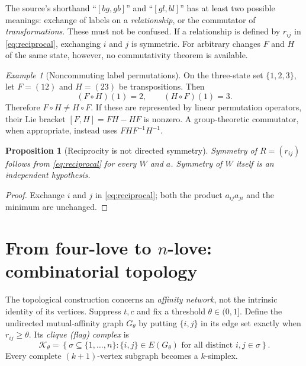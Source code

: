\documentclass[11pt,a4paper]{article}
\numberwithin{equation}{section}
\newtheorem{proposition}[definition]{Proposition}
\theoremstyle{remark}
\newtheorem{example}[definition]{Example}
\newcommand{\K}{\mathcal{K}}
\newcommand{\1}{\mathbf{1}}
\begin{document}
The source's shorthand ``$[bg,gb]$'' and ``$[gl,bl]$'' has at least two
possible meanings: exchange of labels on a \emph{relationship}, or the
commutator of \emph{transformations}.  These must not be confused.
If a relationship is defined by $r_{ij}$ in
\eqref{eq:reciprocal}, exchanging $i$ and $j$ is symmetric.
For arbitrary changes $F$ and $H$ of the same state, however, no
commutativity theorem is available.

\begin{example}[Noncommuting label permutations]
On the three-state set $\{1,2,3\}$, let $F=(12)$ and $H=(23)$
be transpositions.  Then
\begin{equation}
(F\circ H)(1)=2,\qquad (H\circ F)(1)=3.
\end{equation}
Therefore $F\circ H\ne H\circ F$.  If these are represented by linear
permutation operators, their Lie bracket $[F,H]=FH-HF$ is nonzero.
A group-theoretic commutator, when appropriate, instead uses
$FHF^{-1}H^{-1}$.
\end{example}

\begin{proposition}[Reciprocity is not directed symmetry]
Symmetry of $R=(r_{ij})$ follows from \eqref{eq:reciprocal} for every
$W$ and $a$.  Symmetry of $W$ itself is an independent hypothesis.
\end{proposition}
\begin{proof}
Exchange $i$ and $j$ in \eqref{eq:reciprocal}; both the product
$a_{ij}a_{ji}$ and the minimum are unchanged.
\end{proof}

\section{From four-love to \texorpdfstring{$n$}{n}-love: combinatorial topology}

The topological construction concerns an \emph{affinity network}, not
the intrinsic identity of its vertices.  Suppress $t,c$ and fix a
threshold $\theta\in(0,1]$.
Define the undirected mutual-affinity graph $G_\theta$ by putting
$\{i,j\}$ in its edge set exactly when $r_{ij}\ge\theta$.
Its \emph{clique (flag) complex} is
\begin{equation}\label{eq:flag}
\K_\theta=
\left\{\sigma\subseteq\{1,\ldots,n\}:
\{i,j\}\in E(G_\theta)\text{ for all distinct }i,j\in\sigma
\right\}.
\end{equation}
Every complete $(k+1)$-vertex subgraph becomes a $k$-simplex.
\end{document}
